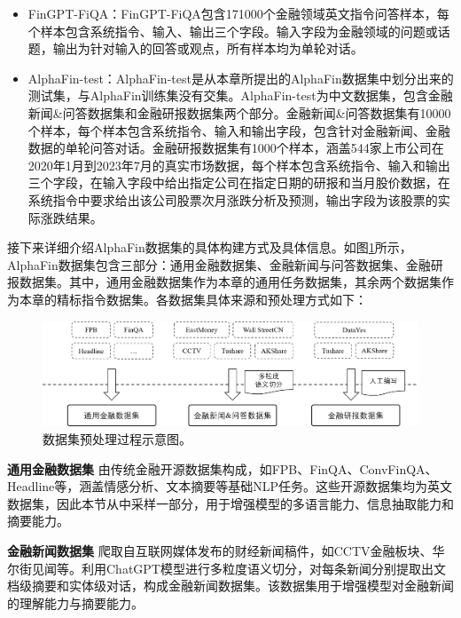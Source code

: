 \begin{itemize}[topsep = 0 pt, itemsep= 0 pt, parsep=0pt, partopsep=0pt, leftmargin=36pt, itemindent=0pt, labelsep=6pt, listparindent=24pt]
	\item FinGPT-FiQA：FinGPT-FiQA包含171000个金融领域英文指令问答样本，每个样本包含系统指令、输入、输出三个字段。输入字段为金融领域的问题或话题，输出为针对输入的回答或观点，所有样本均为单轮对话。

	\item AlphaFin-test：AlphaFin-test是从本章所提出的AlphaFin数据集中划分出来的测试集，与AlphaFin训练集没有交集。AlphaFin-test为中文数据集，包含金融新闻\&问答数据集和金融研报数据集两个部分。金融新闻\&问答数据集有10000个样本，每个样本包含系统指令、输入和输出字段，包含针对金融新闻、金融数据的单轮问答对话。金融研报数据集有1000个样本，涵盖544家上市公司在2020年1月到2023年7月的真实市场数据，每个样本包含系统指令、输入和输出三个字段，在输入字段中给出指定公司在指定日期的研报和当月股价数据，在系统指令中要求给出该公司股票次月涨跌分析及预测，输出字段为该股票的实际涨跌结果。
\end{itemize}

接下来详细介绍AlphaFin数据集的具体构建方式及具体信息。如图\ref{dataset_process}所示，AlphaFin数据集包含三部分：通用金融数据集、金融新闻与问答数据集、金融研报数据集。其中，通用金融数据集作为本章的通用任务数据集，其余两个数据集作为本章的精标指令数据集。各数据集具体来源和预处理方式如下：

\begin{figure}[htbp]
	\centering
	\includegraphics[scale=0.6]{Fig/dataset_process.png}
	\caption{\label{dataset_process}数据集预处理过程示意图。}
\end{figure}

\textbf{通用金融数据集} 由传统金融开源数据集构成，如FPB\cite{DBLP:journals/jasis/MaloSKWT14}、FinQA\cite{DBLP:conf/acl/ZhuLHWZLFC20}、ConvFinQA\cite{DBLP:journals/corr/abs-2310-00566}、Headline\cite{DBLP:journals/corr/abs-2009-04202}等，涵盖情感分析、文本摘要等基础NLP任务。这些开源数据集均为英文数据集，因此本节从中采样一部分，用于增强模型的多语言能力、信息抽取能力和摘要能力。

\textbf{金融新闻数据集} 爬取自互联网媒体发布的财经新闻稿件，如CCTV金融板块、华尔街见闻等。利用ChatGPT\cite{DBLP:conf/nips/Ouyang0JAWMZASR22}模型进行多粒度语义切分，对每条新闻分别提取出文档级摘要和实体级对话，构成金融新闻数据集。该数据集用于增强模型对金融新闻的理解能力与摘要能力。

